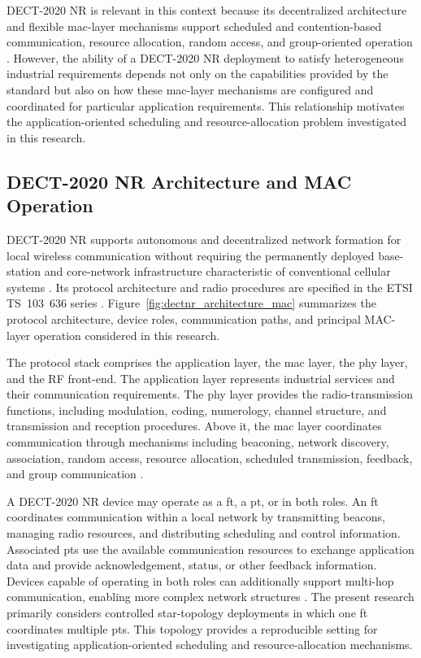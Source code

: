 \documentclass[12pt,a4paper]{article}
\begin{document}
DECT-2020 NR is relevant in this context because its decentralized architecture and flexible \gls{mac}-layer mechanisms support scheduled and contention-based communication, resource allocation, random access, and group-oriented operation \cite{etsi_ts103636_1,etsi_ts103636_4,perez-guiraoDECTNRUnveiling2022,kovalchukovDECT2020NewRadio2022}. However, the ability of a DECT-2020 NR deployment to satisfy heterogeneous industrial requirements depends not only on the capabilities provided by the standard but also on how these \gls{mac}-layer mechanisms are configured and coordinated for particular application requirements. This relationship motivates the application-oriented scheduling and resource-allocation problem investigated in this research.

\subsection{DECT-2020 NR Architecture and MAC Operation}
\label{subsec:dect-architecture-mac}

DECT-2020 NR supports autonomous and decentralized network formation for local wireless communication without requiring the permanently deployed base-station and core-network infrastructure characteristic of conventional cellular systems \cite{kovalchukovDECT2020NewRadio2022,dhanwaniAssessmentCandidateTechnology2020}. Its protocol architecture and radio procedures are specified in the ETSI TS~103~636 series \cite{etsi_ts103636_1,etsi_ts103636_2,etsi_ts103636_3,etsi_ts103636_4}. Figure~\ref{fig:dectnr_architecture_mac} summarizes the protocol architecture, device roles, communication paths, and principal MAC-layer operation considered in this research.

The protocol stack comprises the application layer, the \gls{mac} layer, the \gls{phy} layer, and the RF front-end. The application layer represents industrial services and their communication requirements. The \gls{phy} layer provides the radio-transmission functions, including modulation, coding, numerology, channel structure, and transmission and reception procedures. Above it, the \gls{mac} layer coordinates communication through mechanisms including beaconing, network discovery, association, random access, resource allocation, scheduled transmission, feedback, and group communication \cite{etsi_ts103636_2,etsi_ts103636_3,etsi_ts103636_4}.

A DECT-2020 NR device may operate as a \gls{ft}, a \gls{pt}, or in both roles. An \gls{ft} coordinates communication within a local network by transmitting beacons, managing radio resources, and distributing scheduling and control information. Associated \glspl{pt} use the available communication resources to exchange application data and provide acknowledgement, status, or other feedback information. Devices capable of operating in both roles can additionally support multi-hop communication, enabling more complex network structures \cite{etsi_ts103636_1,etsi_ts103636_4}. The present research primarily considers controlled star-topology deployments in which one \gls{ft} coordinates multiple \glspl{pt}. This topology provides a reproducible setting for investigating application-oriented scheduling and resource-allocation mechanisms.
\end{document}
